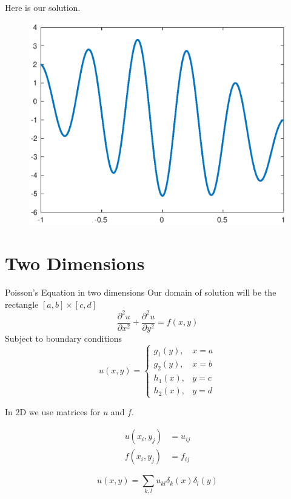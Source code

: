 \documentclass{beamer}
\begin{document}
\begin{frame}{Here is our solution.}{}
\begin{figure}
\centering
\includegraphics[width=\linewidth]{Figures/Poisson1D}
\label{fig:Poisson1D}
\end{figure}
\end{frame}




\section{Two Dimensions}

\begin{frame}{Poisson's Equation in two dimensions}{}
Our domain of solution will be the rectangle $[a,b] \times [c,d]$
\begin{equation*}
\frac{\partial^2 u}{\partial x^2}+\frac{\partial^2 u}{\partial y^2}=f(x,y)
\end{equation*}
Subject to boundary conditions 
\begin{equation*}
u(x,y)=\begin{cases}
g_1(y), & x=a\\
g_2(y), & x=b\\
h_1(x), & y=c\\
h_2(x), & y=d
\end{cases}
\end{equation*}

\end{frame}

\begin{frame}{In 2D we use matrices for $u$ and $f$.}{}

\begin{align*}
u(x_i, y_j) &= u_{ij}\\
f(x_i, y_j) &= f_{ij}
\end{align*}

\begin{equation*}
u(x,y)=\sum_{k,l}u_{kl}\delta_k(x)\delta_l(y)
\end{equation*}

\end{frame}
\end{document}
